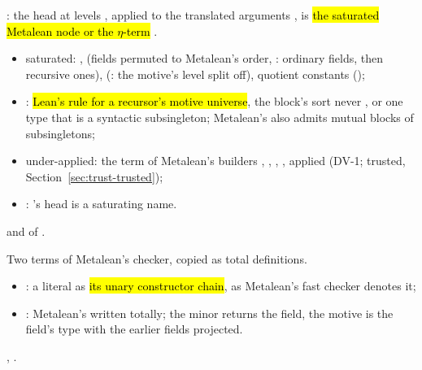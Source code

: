 \begin{definition}
  \label{def:EraseProof-SatTr}
  \leanok
   : the head  at levels , applied to
  the translated arguments , is \hl{the saturated Metalean node or the $\eta$-term}
  .
  \begin{itemize}
  \item saturated: ,  (fields permuted to Metalean's order,
        : ordinary fields, then recursive ones), 
        (: the motive's level split off), quotient constants ();
  \item {}: \hl{Lean's rule for a recursor's motive universe}, the block's sort
        never , or one type that is a syntactic subsingleton; Metalean's
         also admits mutual blocks of subsingletons;
  \item under-applied: the term of Metalean's builders , ,
        , , applied (DV-1; trusted,
        Section~\ref{sec:trust-trusted});
  \item {}: 's head is a saturating name.
  \end{itemize}
    and  of
  .
\end{definition}

\begin{definition}
  \label{def:EraseProof-natLitM}
  \leanok
   Two terms of Metalean's checker, copied as total definitions.
  \begin{itemize}
  \item {}: a  literal as \hl{its unary constructor chain}, as Metalean's
        fast checker denotes it;
  \item {}: Metalean's  written totally; the minor
        returns the field, the motive is the field's type with the earlier fields projected.
  \end{itemize}
   ,
  .
\end{definition}

